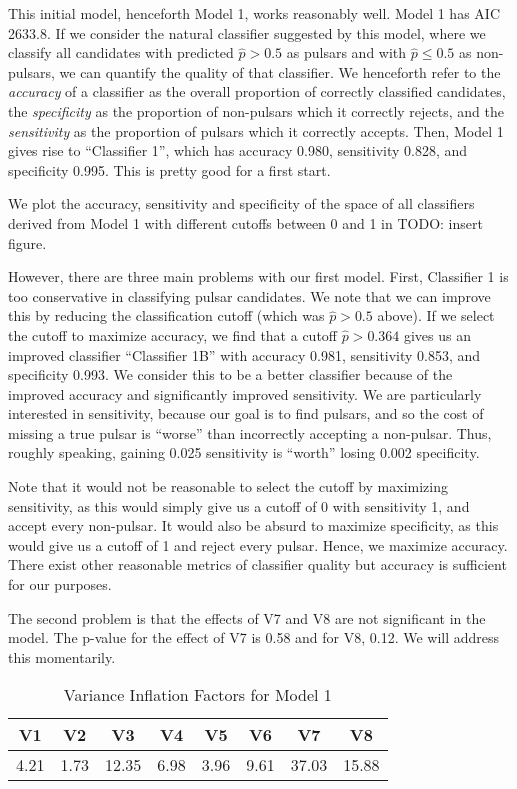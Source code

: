 \documentclass[11pt, oneside]{article}
\begin{document}
This initial model, henceforth Model 1, works reasonably well. Model 1 has AIC 2633.8. If we consider the natural classifier suggested by this model, where we classify all candidates with predicted $\hat{p} > 0.5$ as pulsars and with $\hat{p} \leq 0.5$ as non-pulsars, we can quantify the quality of that classifier. We henceforth refer to the \emph{accuracy} of a classifier as the overall proportion of correctly classified candidates, the \emph{specificity} as the proportion of non-pulsars which it correctly rejects, and the \emph{sensitivity} as the proportion of pulsars which it correctly accepts. Then, Model 1 gives rise to ``Classifier 1'', which has accuracy 0.980, sensitivity 0.828, and specificity 0.995.  This is pretty good for a first start. 

We plot the accuracy, sensitivity and specificity of the space of all classifiers derived from Model 1 with different cutoffs between 0 and 1 in {\color{red} TODO: insert figure}.

However, there are three main problems with our first model. First, Classifier 1 is too conservative in classifying pulsar candidates. We note that we can improve this by reducing the classification cutoff (which was $\hat{p} > 0.5$ above). If we select the cutoff to maximize accuracy, we find that a cutoff $\hat{p} > 0.364$ gives us an improved classifier ``Classifier 1B'' with accuracy 0.981, sensitivity 0.853, and specificity 0.993. We consider this to be a better classifier because of the improved accuracy and significantly improved sensitivity. We are particularly interested in sensitivity, because our goal is to find pulsars, and so the cost of missing a true pulsar is ``worse'' than incorrectly accepting a non-pulsar. Thus, roughly speaking, gaining 0.025 sensitivity is ``worth'' losing 0.002 specificity. 

Note that it would not be reasonable to select the cutoff by maximizing sensitivity, as this would simply give us a cutoff of 0 with sensitivity 1, and accept every non-pulsar. It would also be absurd to maximize specificity, as this would give us a cutoff of 1 and reject every pulsar. Hence, we maximize accuracy. There exist other reasonable metrics of classifier quality but accuracy is sufficient for our purposes. 

The second problem is that the effects of V7 and V8 are not significant in the model. The p-value for the effect of V7 is 0.58 and for V8, 0.12. We will address this momentarily. 

\begin{table}[h!]
\centering
\begin{tabular}{|c c c c c c c c|} 
 \hline
  V1  &  V2 &  V3 &   V4 &   V5&    V6  &  V7  &  V8 \\
  \hline
 4.21 & 1.73 &12.35 & 6.98 & 3.96 & 9.61& 37.03 &15.88 \\
  \hline
\end{tabular}
\caption{Variance Inflation Factors for Model 1}
\label{table:vif}
\end{table}
\end{document}
